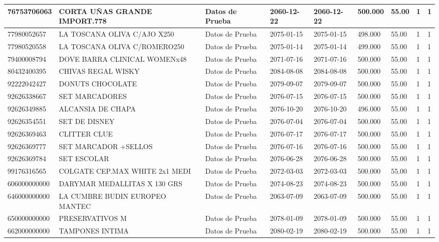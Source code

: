 \documentclass[a4paper,12pt]{article}
\begin{document}
\begin{landscape}
\begin{longtable}{|p{4cm}|p{2.5cm}|p{2.5cm}|p{1.8cm}|p{1.8cm}|p{1cm}|p{1cm}|p{3cm}|p{3cm}||}
76753706063 & CORTA UÑAS GRANDE IMPORT.778 & Datos de Prueba & 2060-12-22 & 2060-12-22 & 500.000 & 55.00 & 1 & 1 \\ \hline 
77980052657 & LA TOSCANA OLIVA C/AJO X250 & Datos de Prueba & 2075-01-15 & 2075-01-15 & 498.000 & 55.00 & 1 & 1 \\ \hline 
77980520558 & LA TOSCANA OLIVA C/ROMERO250 & Datos de Prueba & 2075-01-14 & 2075-01-14 & 499.000 & 55.00 & 1 & 1 \\ \hline 
79400008794 & DOVE BARRA CLINICAL WOMENx48 & Datos de Prueba & 2071-07-16 & 2071-07-16 & 500.000 & 55.00 & 1 & 1 \\ \hline 
80432400395 & CHIVAS REGAL WISKY & Datos de Prueba & 2084-08-08 & 2084-08-08 & 500.000 & 55.00 & 1 & 1 \\ \hline 
92222042427 & DONUTS CHOCOLATE & Datos de Prueba & 2079-09-07 & 2079-09-07 & 500.000 & 55.00 & 1 & 1 \\ \hline 
92626338667 & SET MARCADORES & Datos de Prueba & 2076-07-15 & 2076-07-15 & 500.000 & 55.00 & 1 & 1 \\ \hline 
92626349885 & ALCANSIA DE CHAPA & Datos de Prueba & 2076-10-20 & 2076-10-20 & 496.000 & 55.00 & 1 & 1 \\ \hline 
92626354551 & SET DE DISNEY & Datos de Prueba & 2076-07-04 & 2076-07-04 & 500.000 & 55.00 & 1 & 1 \\ \hline 
92626369463 & CLITTER CLUE & Datos de Prueba & 2076-07-17 & 2076-07-17 & 500.000 & 55.00 & 1 & 1 \\ \hline 
92626369777 & SET MARCADOR +SELLOS & Datos de Prueba & 2076-07-16 & 2076-07-16 & 500.000 & 55.00 & 1 & 1 \\ \hline 
92626369784 & SET ESCOLAR & Datos de Prueba & 2076-06-28 & 2076-06-28 & 500.000 & 55.00 & 1 & 1 \\ \hline 
99176316565 & COLGATE CEP.MAX WHITE 2x1 MEDI & Datos de Prueba & 2072-03-03 & 2072-03-03 & 500.000 & 55.00 & 1 & 1 \\ \hline 
606000000000 & DARYMAR MEDALLITAS X 130 GRS & Datos de Prueba & 2074-08-23 & 2074-08-23 & 500.000 & 55.00 & 1 & 1 \\ \hline 
646000000000 & LA CUMBRE BUDIN EUROPEO MANTEC & Datos de Prueba & 2063-07-09 & 2063-07-09 & 500.000 & 55.00 & 1 & 1 \\ \hline 
650000000000 & PRESERVATIVOS M & Datos de Prueba & 2078-01-09 & 2078-01-09 & 500.000 & 55.00 & 1 & 1 \\ \hline 
662000000000 & TAMPONES INTIMA & Datos de Prueba & 2080-02-19 & 2080-02-19 & 500.000 & 55.00 & 1 & 1 \\ \hline 

\end{longtable}
\end{landscape}
\end{document}
